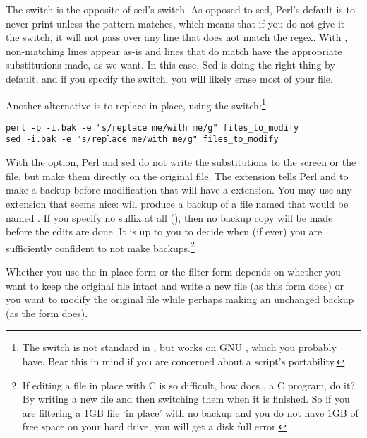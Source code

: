 The  switch is the opposite of sed's  switch.
As opposed to sed, Perl's default is to never print
unless the pattern matches, which means that if you do not give it the
 switch, it will not pass over any line that does not match the regex.
With , non-matching lines appear as-is and lines that do match
have the appropriate substitutions made, as we want. 
In this case, Sed is doing the right thing by default, and if you specify
the  switch, you will likely erase
most of your file. 


Another alternative is to replace-in-place, using the 
switch:\footnote{The  switch is not standard in , but
works on GNU , which you probably have. Bear this in mind if you
are concerned about a script's portability.}
\begin{lstlisting}
perl -p -i.bak -e "s/replace me/with me/g" files_to_modify
sed -i.bak -e "s/replace me/with me/g" files_to_modify
\end{lstlisting}
With the  option, Perl and sed do not write
the substitutions to the screen or the \bi{>} file, but
make them directly on the original file.
The  extension tells Perl
and  to make a backup before modification that will have a  extension.
You may use any extension that seems nice:  will produce
a backup of a file named  that would be named .
If you specify no suffix at all (), then no backup copy will be
made before the edits are done. It is up to you to decide when (if ever)
you are sufficiently confident to not make backups.\footnote{If editing a file in
place with C is so difficult, how does , a C program, do it? By
writing a new file and then switching them when it is finished. So if you
are filtering a 1GB file `in place' with no backup and you do not have
1GB of free space on your hard drive, you will get a disk full error.}

Whether you use the in-place form or the filter form depends on whether
you want to keep the original file intact and write a new file (as this
form does) or you want to modify the original file while perhaps making
an unchanged backup (as the  form does).


